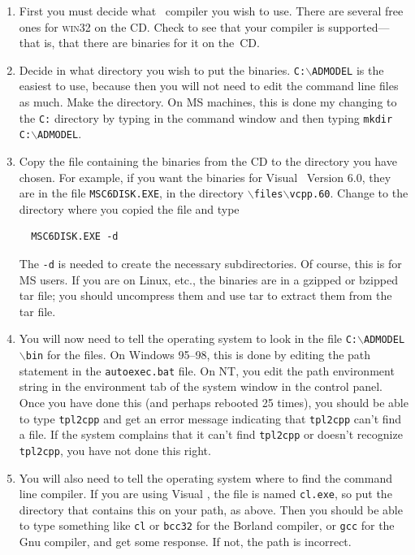 \documentclass{admbmanual}
\newcommand\mybackslash{$\backslash$}
\begin{document}
\begin{enumerate}

\item First you must decide what \cplus\ compiler you wish to use.
There are several free ones for \textsc{win}32 on the \ADMS CD. Check to see
that your compiler is supported---that is, that there are \ADMS
binaries for it on the~CD.

\item Decide in what directory you wish to put the \ADMS
binaries. \texttt{C:\mybackslash ADMODEL} is the easiest to use,
because then you will not need to edit the command line
files as much.  Make the directory. On MS machines, this is
done my changing to the \texttt{C:} directory by typing in the command window
and then typing \texttt{mkdir C:\mybackslash ADMODEL}.

\item Copy the file containing the \ADMS binaries from the
CD to the directory you have chosen. For example, if you want the
binaries for Visual \cplus\ Version 6.0, they are in the file
\texttt{MSC6DISK.EXE}, in the directory \texttt{\mybackslash files\mybackslash vcpp.60}.
Change to the directory where you copied the file and type
\begin{lstlisting}
  MSC6DISK.EXE -d
\end{lstlisting}
The \texttt{-d} is needed to create the
necessary subdirectories. Of course, this is for MS users. If you
are on Linux, etc., the binaries are in a gzipped or bzipped tar file; 
you should uncompress them and use tar to extract them from the tar file. 

\item You will now need to tell the operating system to look in the
file \texttt{C:\mybackslash ADMODEL\mybackslash bin} for the
\ADMS files. On Windows 95--98, this is done by editing the
path statement in the \texttt{autoexec.bat} file. On NT, you edit
the path environment string in the environment tab of the
system window in the control panel. Once you have done this
(and perhaps rebooted 25 times), you should be able to 
type \texttt{tpl2cpp} and get an error message indicating that \texttt{tpl2cpp} can't find
a file. If the system complains that it can't find \texttt{tpl2cpp}
or doesn't recognize \texttt{tpl2cpp}, you have not done this right.

\item  You will also need to tell the operating system
where to find the command line compiler. If you are using
Visual \cplus, the file is named \texttt{cl.exe}, so put the
directory that contains this on your path, as above.
Then you should be able to type something like \texttt{cl}
or \texttt{bcc32} for the Borland compiler, or \texttt{gcc}
for the Gnu compiler, and get some response. If not,
the path is incorrect.  


\end{enumerate}
\end{document}
